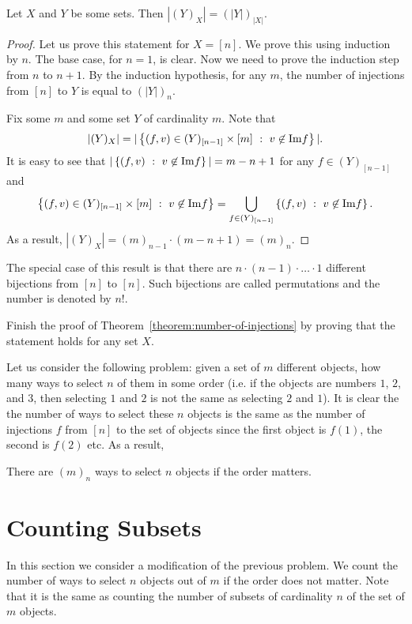 \begin{theorem}
\label{theorem:number-of-injections}
  Let $X$ and $Y$ be some sets. Then $|(Y)_X| = (|Y|)_{|X|}$.
\end{theorem}
\begin{proof}
  Let us prove this statement for $X = [n]$. We prove this using induction by
  $n$. The base case, for $n = 1$, is clear. Now we need to prove the induction
  step from $n$ to $n + 1$. By the induction hypothesis, for any $m$, the
  number of injections from $[n]$ to $Y$ is equal to $(|Y|)_n$.

  Fix some $m$ and some set $Y$ of cardinality $m$. Note that
  \[
    |(Y)_X| =
    |\set[v \not\in \Im f]{(f, v) \in (Y)_{[n - 1]} \times [m]}|.
  \]
  It is easy to see that $|\set[v \not\in \Im f]{(f, v)}| = m - n + 1$
  for any $f \in (Y)_{[n - 1]}$ and
  \[
    \set[v \not\in \Im f]{(f, v) \in (Y)_{[n - 1]} \times [m]} =
    \bigcup_{f \in (Y)_{[n - 1]}} \set[v \not\in \Im f]{(f, v)}.
  \]
  As a result, $|(Y)_X| = (m)_{n - 1} \cdot (m - n + 1) = (m)_n$.
\end{proof}

The special case of this result is that there are
$n \cdot (n - 1) \cdot  \ldots \cdot  1$ different
bijections from $[n]$ to $[n]$. Such bijections are called permutations and the
number is denoted by $n!$.

\begin{exercise}
  Finish the proof of Theorem~\ref{theorem:number-of-injections} by proving that
  the statement holds for any set $X$.
\end{exercise}

Let us consider the following problem: given a set of $m$ different objects,
how many ways to select $n$ of them in some order (i.e. if the objects are
numbers $1$, $2$, and $3$, then selecting $1$ and $2$ is not the same as
selecting $2$ and $1$). It is clear the the number of ways to select these $n$
objects is the same as the number of injections $f$ from $[n]$ to the set of
objects since the first object is $f(1)$, the second is $f(2)$ etc.
As a result,
\begin{corollary}
  There are $(m)_n$ ways to select $n$ objects if the order matters.
\end{corollary}

\section{Counting Subsets}
In this section we consider a modification of the previous problem. We count
the number of ways to select $n$ objects out of $m$ if the order does not
matter. Note that it is the same as counting the number of subsets of
cardinality $n$ of the set of $m$ objects.

